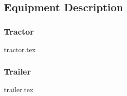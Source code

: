 \subsection{Equipment Description}
\label{subsection:equipment-description}
%
{
    \noindent%
    \begin{minipage}[t]{0.495\linewidth}
        \subsubsection{Tractor}
        \begin{center}
            {tractor.tex}
        \end{center}
    \end{minipage}%
    \hfill%
    \begin{minipage}[t]{0.495\linewidth}
        \subsubsection{Trailer}
        \begin{center}
            {trailer.tex}
        \end{center}
    \end{minipage}
}
\vspace{1em}
